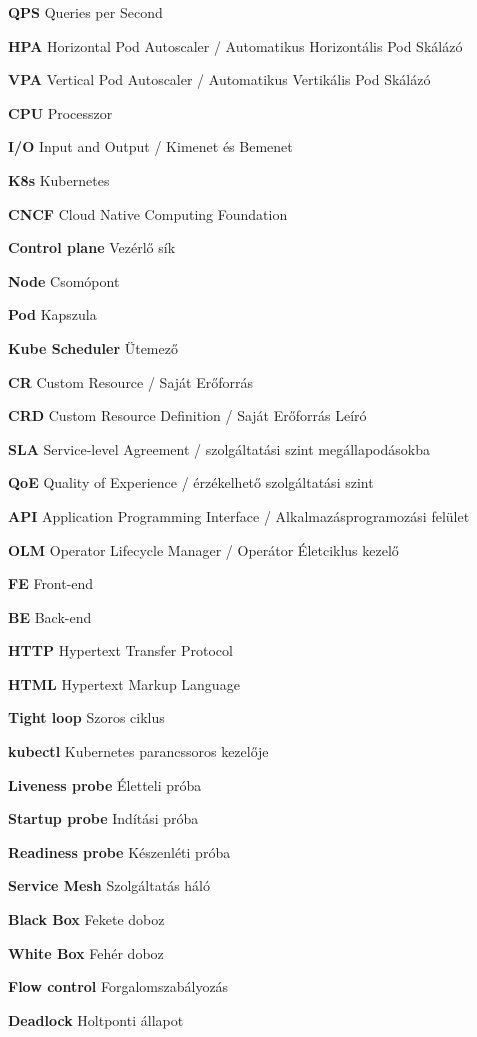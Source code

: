 \begin{multicols}{2}
\textbf{QPS} Queries per Second 

\textbf{HPA} Horizontal Pod Autoscaler / Automatikus Horizontális Pod Skálázó 

\textbf{VPA} Vertical Pod Autoscaler / Automatikus Vertikális Pod Skálázó 

\textbf{CPU} Processzor 

\textbf{I/O} Input and Output / Kimenet és Bemenet 

\textbf{K8s} Kubernetes 

\textbf{CNCF} Cloud Native Computing Foundation 

\textbf{Control plane} Vezérlő sík 

\textbf{Node} Csomópont 

\textbf{Pod} Kapszula 

\textbf{Kube Scheduler} Ütemező 

\textbf{CR} Custom Resource / Saját Erőforrás 

\textbf{CRD} Custom Resource Definition / Saját Erőforrás Leíró

\textbf{SLA} Service-level Agreement / szolgáltatási szint megállapodásokba

\textbf{QoE} Quality of Experience / érzékelhető szolgáltatási szint

\columnbreak

\textbf{API} Application Programming Interface / Alkalmazásprogramozási felület 

\textbf{OLM} Operator Lifecycle Manager / Operátor Életciklus kezelő 

\textbf{FE} Front-end 

\textbf{BE} Back-end 

\textbf{HTTP} Hypertext Transfer Protocol 

\textbf{HTML} Hypertext Markup Language 

\textbf{Tight loop} Szoros ciklus 

\textbf{kubectl} Kubernetes parancssoros kezelője 

\textbf{Liveness probe} Életteli próba 

\textbf{Startup probe} Indítási próba 

\textbf{Readiness probe} Készenléti próba 

\textbf{Service Mesh} Szolgáltatás háló

\textbf{Black Box} Fekete doboz

\textbf{White Box} Fehér doboz

\textbf{Flow control} Forgalomszabályozás

\textbf{Deadlock} Holtponti állapot


\end{multicols}

